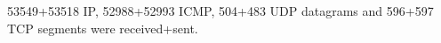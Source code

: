 53549+53518 IP, 52988+52993 ICMP, 504+483 UDP datagrams and 596+597 TCP segments were received+sent.